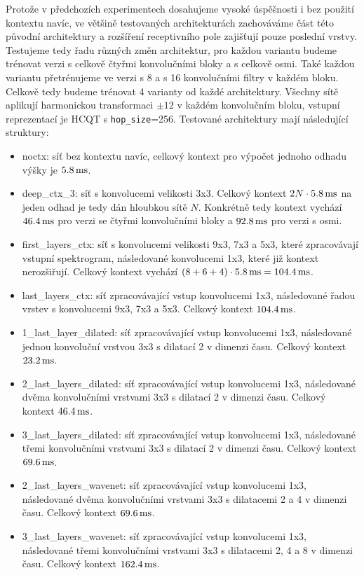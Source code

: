 Protože v předchozích experimentech dosahujeme vysoké úspěšnosti i bez použití kontextu navíc, ve většině testovaných architekturách zachováváme část této původní architektury a rozšíření receptivního pole zajišťují pouze poslední vrstvy. Testujeme tedy řadu různých změn architektur, pro každou variantu budeme trénovat verzi s celkově čtyřmi konvolučními bloky a s celkově osmi. Také každou variantu přetrénujeme ve verzi s 8 a s 16 konvolučními filtry v každém bloku. Celkově tedy budeme trénovat 4 varianty od každé architektury. Všechny sítě aplikují harmonickou transformaci $\pm 12$ v každém konvolučním bloku, vstupní reprezentací je HCQT s \texttt{hop\_size}=256. Testované architektury mají následující struktury:
\begin{itemize}
    \item  noctx: síť bez kontextu navíc, celkový kontext pro výpočet jednoho odhadu výšky je $5.8\,\rm ms$.
    \item  deep\_ctx\_3: síť s konvolucemi velikosti 3x3. Celkový kontext $2N \cdot 5.8\,\rm ms$ na jeden odhad je tedy dán hloubkou sítě $N$. Konkrétně tedy kontext vychází $46.4\,\rm ms$ pro verzi se čtyřmi konvolučními bloky a $92.8\,\rm ms$ pro verzi s osmi.
    \item  first\_layers\_ctx: síť s konvolucemi velikosti 9x3, 7x3 a 5x3, které zpracovávají vstupní spektrogram, následované konvolucemi 1x3, které již kontext nerozšiřují. Celkový kontext vychází $(8+6+4) \cdot 5.8\,\rm ms = 104.4\,\rm ms$.
    \item  last\_layers\_ctx: síť zpracovávající vstup konvolucemi 1x3, následované řadou vrstev s konvolucemi 9x3, 7x3 a 5x3. Celkový kontext $104.4\,\rm ms$.
    \item  1\_last\_layer\_dilated: síť zpracovávající vstup konvolucemi 1x3, následované jednou konvoluční vrstvou 3x3 s dilatací 2 v dimenzi času. Celkový kontext $23.2\,\rm ms$.
    \item  2\_last\_layers\_dilated: síť zpracovávající vstup konvolucemi 1x3, následované dvěma konvolučními vrstvami 3x3 s dilatací 2 v dimenzi času. Celkový kontext $46.4\,\rm ms$.
    \item  3\_last\_layers\_dilated: síť zpracovávající vstup konvolucemi 1x3, následované třemi konvolučními vrstvami 3x3 s dilatací 2 v dimenzi času. Celkový kontext $69.6\,\rm ms$.
    \item  2\_last\_layers\_wavenet: síť zpracovávající vstup konvolucemi 1x3, následované dvěma konvolučními vrstvami 3x3 s dilatacemi 2 a 4 v dimenzi času. Celkový kontext $69.6\,\rm ms$.
    \item  3\_last\_layers\_wavenet: síť zpracovávající vstup konvolucemi 1x3, následované třemi konvolučními vrstvami 3x3 s dilatacemi 2, 4 a 8 v dimenzi času. Celkový kontext $162.4\,\rm ms$.
\end{itemize}

